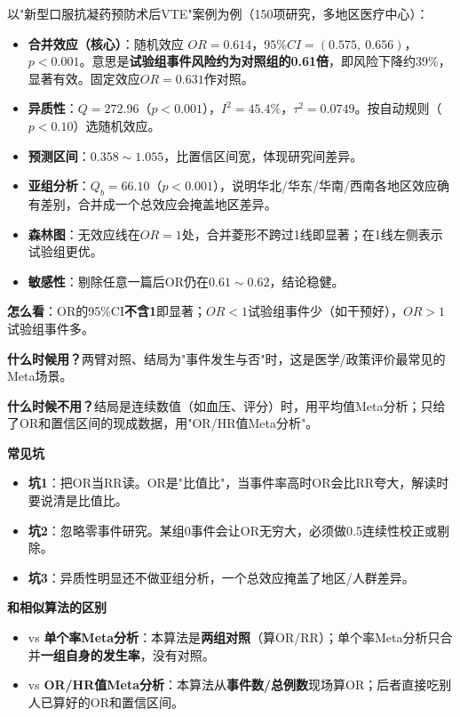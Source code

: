 \begin{algoresult}
以"新型口服抗凝药预防术后VTE"案例为例（150项研究，多地区医疗中心）：

\begin{itemize}
    \item \textbf{合并效应（核心）}：随机效应 $OR=0.614$，$95\%CI=(0.575,\ 0.656)$，$p<0.001$。意思是\textbf{试验组事件风险约为对照组的0.61倍}，即风险下降约39\%，显著有效。固定效应$OR=0.631$作对照。
    \item \textbf{异质性}：$Q=272.96$（$p<0.001$），$I^2=45.4\%$，$\tau^2=0.0749$。按自动规则（$p<0.10$）选随机效应。
    \item \textbf{预测区间}：$0.358\sim1.055$，比置信区间宽，体现研究间差异。
    \item \textbf{亚组分析}：$Q_b=66.10$（$p<0.001$），说明华北/华东/华南/西南各地区效应确有差别，合并成一个总效应会掩盖地区差异。
    \item \textbf{森林图}：无效应线在$OR=1$处，合并菱形不跨过1线即显著；在1线左侧表示试验组更优。
    \item \textbf{敏感性}：剔除任意一篇后OR仍在$0.61\sim0.62$，结论稳健。
\end{itemize}

\textbf{怎么看}：OR的95\%CI\textbf{不含1}即显著；$OR<1$试验组事件少（如干预好），$OR>1$试验组事件多。
\end{algoresult}

\begin{algonotes}
\textbf{什么时候用？}两臂对照、结局为"事件发生与否"时，这是医学/政策评价最常见的Meta场景。

\textbf{什么时候不用？}结局是连续数值（如血压、评分）时，用平均值Meta分析；只给了OR和置信区间的现成数据，用"OR/HR值Meta分析"。

\textbf{常见坑}
\begin{itemize}
    \item \textbf{坑1}：把OR当RR读。OR是"比值比"，当事件率高时OR会比RR夸大，解读时要说清是比值比。
    \item \textbf{坑2}：忽略零事件研究。某组0事件会让OR无穷大，必须做0.5连续性校正或剔除。
    \item \textbf{坑3}：异质性明显还不做亚组分析，一个总效应掩盖了地区/人群差异。
\end{itemize}

\textbf{和相似算法的区别}
\begin{itemize}
    \item vs \textbf{单个率Meta分析}：本算法是\textbf{两组对照}（算OR/RR）；单个率Meta分析只合并\textbf{一组自身的发生率}，没有对照。
    \item vs \textbf{OR/HR值Meta分析}：本算法从\textbf{事件数/总例数}现场算OR；后者直接吃别人已算好的OR和置信区间。
\end{itemize}
\end{algonotes}

